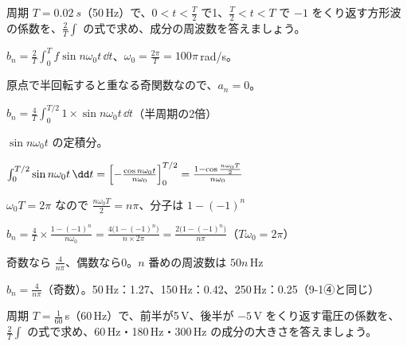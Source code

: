 \begin{reidai}
周期 $T=\qty{0.02}{s}$（50\,Hz）で、$0<t<\frac{T}{2}$ で1、$\frac{T}{2}<t<T$ で $-1$ をくり返す方形波の係数を、$\frac{2}{T}\int$ の式で求め、成分の周波数を答えましょう。\par
\kangaekata {}\par
{}\enspace $b_n=\frac{2}{T}\int_0^Tf\sin n\omega_0t\,\dd t$、$\omega_0=\frac{2\pi}{T}=100\pi$\,rad/s。\par
{}\enspace 原点で半回転すると重なる奇関数なので、$a_n=0$。\par
\kixca $b_n=\frac{4}{T}\int_0^{T/2}1\times\sin n\omega_0t\,\dd t$（半周期の2倍）\par
{}\enspace $\sin n\omega_0t$ の定積分。\par
\shiki\kixcs $\int_0^{T/2}\sin n\omega_0t\,\dd t=\Bigl[-\frac{\cos n\omega_0t}{n\omega_0}\Bigr]_0^{T/2}=\frac{1-\cos\frac{n\omega_0T}{2}}{n\omega_0}$\par
\kixca $\omega_0T=2\pi$ なので $\frac{n\omega_0T}{2}=n\pi$、分子は $1-(-1)^n$\par
\kixca $b_n=\frac{4}{T}\times\frac{1-(-1)^n}{n\omega_0}=\frac{4\bigl(1-(-1)^n\bigr)}{n\times2\pi}=\frac{2\bigl(1-(-1)^n\bigr)}{n\pi}$\quad （$T\omega_0=2\pi$）\par
\kixca 奇数なら $\frac{4}{n\pi}$、偶数なら0。$n$ 番めの周波数は $50n$\,Hz\par
\kotae $b_n=\frac{4}{n\pi}$（奇数）。50\,Hz：1.27、150\,Hz：0.42、250\,Hz：0.25（9-1④と同じ）
\end{reidai}

\begin{jibun}
周期 $T=\frac{1}{60}$\,s（60\,Hz）で、前半が5\,V、後半が $-5$\,V をくり返す電圧の係数を、$\frac{2}{T}\int$ の式で求め、60\,Hz・180\,Hz・300\,Hz の成分の大きさを答えましょう。
\end{jibun}

